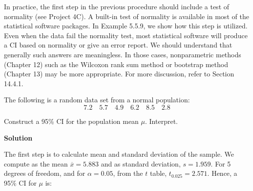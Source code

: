 In practice, the first step in the previous procedure should include a test of normality (see Project 4C). A built-in test of normality is available in most of the statistical software packages. In Example 5.5.9, we show how this step is utilized. Even when the data fail the normality test, most statistical software will produce a CI based on normality or give an error report. We should understand that generally such answers are meaningless. In those cases, nonparametric methods (Chapter 12) such as the Wilcoxon rank sum method or bootstrap method (Chapter 13) may be more appropriate. For more discussion, refer to Section 14.4.1.

\begin{example}[5.5.7]
The following is a random data set from a normal population:
\[
7.2 \quad 5.7 \quad 4.9 \quad 6.2 \quad 8.5 \quad 2.8
\]

Construct a 95\% CI for the population mean $\mu$. Interpret.

\textbf{Solution}

The first step is to calculate mean and standard deviation of the sample. We compute as the mean $\overline{x} = 5.883$ and as standard deviation, $s = 1.959$. For 5 degrees of freedom, and for $\alpha = 0.05$, from the $t$ table, $t_{0.025} = 2.571$. Hence, a 95\% CI for $\mu$ is:
\end{example}
